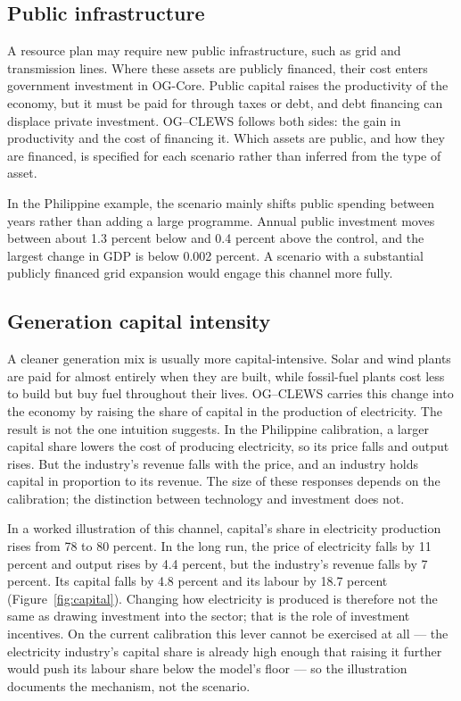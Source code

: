 \subsection{Public infrastructure}

A resource plan may require new public infrastructure, such as grid and transmission
lines. Where these assets are publicly financed, their cost enters government investment
in OG-Core. Public capital raises the productivity of the economy, but it must be paid for
through taxes or debt, and debt financing can displace private investment. OG--CLEWS
follows both sides: the gain in productivity and the cost of financing it. Which assets are
public, and how they are financed, is specified for each scenario rather than inferred from
the type of asset.

In the Philippine example, the scenario mainly shifts public spending between years rather
than adding a large programme. Annual public investment moves between about 1.3 percent
below and 0.4 percent above the control, and the largest change in GDP is below 0.002
percent. A scenario with a substantial publicly financed grid expansion would engage this
channel more fully.

\subsection{Generation capital intensity}

A cleaner generation mix is usually more capital-intensive. Solar and wind plants are paid
for almost entirely when they are built, while fossil-fuel plants cost less to build but
buy fuel throughout their lives. OG--CLEWS carries this change into the economy by raising
the share of capital in the production of electricity. The result is not the one intuition
suggests. In the Philippine calibration, a larger capital share lowers the cost of
producing electricity, so its price falls and output rises. But the industry's revenue falls
with the price, and an industry holds capital in proportion to its revenue. The size of
these responses depends on the calibration; the distinction between technology and
investment does not.

In a worked illustration of this channel, capital's share in electricity production
rises from 78 to 80 percent. In the long run, the price of electricity falls by 11
percent and output rises by 4.4 percent, but the industry's revenue falls by 7 percent.
Its capital falls by 4.8 percent and its labour by 18.7 percent
(Figure~\ref{fig:capital}). Changing how electricity is produced is therefore not the
same as drawing investment into the sector; that is the role of investment incentives.
On the current calibration this lever cannot be exercised at all --- the electricity
industry's capital share is already high enough that raising it further would push its
labour share below the model's floor --- so the illustration documents the mechanism,
not the scenario.

